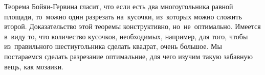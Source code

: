 



Теорема Бойяи-Гервина гласит, что если есть два многоугольника равной площади,
то~можно один разрезать на~кусочки, из~которых можно сложить второй.
Доказательство этой теоремы конструктивно, но~не~оптимально.
Имеется в~виду то, что количество кусочков, необходимых, например, для того,
чтобы из~правильного шестиугольника сделать квадрат, очень большое.
Мы постараемся сделать разрезание оптимальние, для чего изучим такую забавную
вещь, как мозаики.

